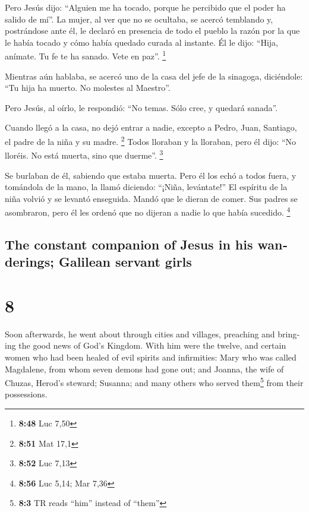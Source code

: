 \begin{paracol}{2}
 Pero Jesús dijo: ``Alguien me ha tocado, porque he
percibido que el poder ha salido de mí''.  La mujer, al
ver que no se ocultaba, se acercó temblando y, postrándose ante él, le
declaró en presencia de todo el pueblo la razón por la que le había
tocado y cómo había quedado curada al instante.  Él le
dijo: ``Hija, anímate. Tu fe te ha sanado. Vete en paz''. \footnote{\textbf{8:48}
  Luc 7,50}

 Mientras aún hablaba, se acercó uno de la casa del jefe
de la sinagoga, diciéndole: ``Tu hija ha muerto. No molestes al
Maestro''.

 Pero Jesús, al oírlo, le respondió: ``No temas. Sólo
cree, y quedará sanada''.

 Cuando llegó a la casa, no dejó entrar a nadie, excepto
a Pedro, Juan, Santiago, el padre de la niña y su madre. \footnote{\textbf{8:51}
  Mat 17,1}  Todos lloraban y la lloraban, pero él dijo:
``No lloréis. No está muerta, sino que duerme''. \footnote{\textbf{8:52}
  Luc 7,13}

 Se burlaban de él, sabiendo que estaba muerta.
 Pero él los echó a todos fuera, y tomándola de la mano,
la llamó diciendo: ``¡Niña, levántate!''  El espíritu de
la niña volvió y se levantó enseguida. Mandó que le dieran de comer.
 Sus padres se asombraron, pero él les ordenó que no
dijeran a nadie lo que había sucedido. \footnote{\textbf{8:56} Luc 5,14;
  Mar 7,36}

\switchcolumn
\begin{otherlanguage}{english}

\hypertarget{the-constant-companion-of-jesus-in-his-wanderings-galilean-servant-girls}{%
\subsection{The constant companion of Jesus in his wanderings; Galilean
servant
girls}\label{the-constant-companion-of-jesus-in-his-wanderings-galilean-servant-girls}}

\hypertarget{section-15}{%
\section{8}\label{section-15}}

 Soon afterwards, he went about through cities and
villages, preaching and bringing the good news of God's Kingdom. With
him were the twelve,  and certain women who had been
healed of evil spirits and infirmities: Mary who was called Magdalene,
from whom seven demons had gone out;  and Joanna, the wife
of Chuzas, Herod's steward; Susanna; and many others who served
them\footnote{\textbf{8:3} TR reads ``him'' instead of ``them''} from
their possessions.


\end{otherlanguage}
\end{paracol}
